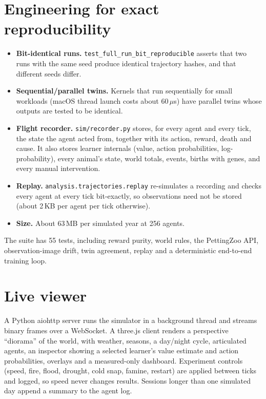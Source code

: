 \documentclass[10pt]{article}
\begin{document}
\section{Engineering for exact reproducibility}
\begin{itemize}
\item \textbf{Bit-identical runs.} \texttt{test\_full\_run\_bit\_reproducible} asserts that two runs with the same
seed produce identical trajectory hashes, and that different seeds differ.
\item \textbf{Sequential/parallel twins.} Kernels that run sequentially for small workloads (macOS thread launch
costs about 60\,$\mu$s) have parallel twins whose outputs are tested to be identical.
\item \textbf{Flight recorder.} \texttt{sim/recorder.py} stores, for every agent and every tick, the state the agent
acted from, together with its action, reward, death and cause. It also stores learner internals (value, action
probabilities, log-probability), every animal's state, world totals, events, births with genes, and every manual
intervention.
\item \textbf{Replay.} \texttt{analysis.trajectories.replay} re-simulates a recording and checks every agent at every
tick bit-exactly, so observations need not be stored (about 2\,KB per agent per tick otherwise).
\item \textbf{Size.} About 63\,MB per simulated year at 256 agents.
\end{itemize}
The suite has 55 tests, including reward purity, world rules, the PettingZoo API, observation-image drift,
twin agreement, replay and a deterministic end-to-end training loop.

\section{Live viewer}
\label{app:viewer}
A Python aiohttp server runs the simulator in a background thread and streams binary frames over a WebSocket. A three.js client renders a perspective ``diorama'' of the world, with weather, seasons, a day/night
cycle, articulated agents, an inspector showing a selected learner's value estimate and action probabilities,
overlays and a measured-only dashboard. Experiment controls (speed, fire, flood, drought, cold snap, famine,
restart) are applied between ticks and logged, so speed never changes results. Sessions longer than one simulated day
append a summary to the agent log.
\end{document}
